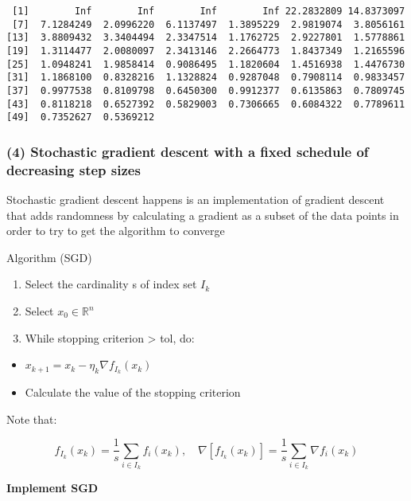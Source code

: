 \documentclass[
  letterpaper,
  DIV=11,
  numbers=noendperiod]{scrartcl}
\providecommand{\tightlist}{%
  \setlength{\itemsep}{0pt}\setlength{\parskip}{0pt}}\usepackage{longtable,booktabs,array}
\begin{document}
\begin{verbatim}
 [1]        Inf        Inf        Inf        Inf 22.2832809 14.8373097
 [7]  7.1284249  2.0996220  6.1137497  1.3895229  2.9819074  3.8056161
[13]  3.8809432  3.3404494  2.3347514  1.1762725  2.9227801  1.5778861
[19]  1.3114477  2.0080097  2.3413146  2.2664773  1.8437349  1.2165596
[25]  1.0948241  1.9858414  0.9086495  1.1820604  1.4516938  1.4476730
[31]  1.1868100  0.8328216  1.1328824  0.9287048  0.7908114  0.9833457
[37]  0.9977538  0.8109798  0.6450300  0.9912377  0.6135863  0.7809745
[43]  0.8118218  0.6527392  0.5829003  0.7306665  0.6084322  0.7789611
[49]  0.7352627  0.5369212
\end{verbatim}

\subsubsection{(4) Stochastic gradient descent with a fixed schedule of
decreasing step
sizes}\label{stochastic-gradient-descent-with-a-fixed-schedule-of-decreasing-step-sizes}

Stochastic gradient descent happens is an implementation of gradient
descent that adds randomness by calculating a gradient as a subset of
the data points in order to try to get the algorithm to converge

Algorithm (SGD)

\begin{enumerate}
\def\labelenumi{\arabic{enumi}.}
\tightlist
\item
  Select the cardinality s of index set \(I_k\)
\item
  Select \(x_0∈\mathbb{R}^n\)
\item
  While stopping criterion \textgreater{} tol, do:
\end{enumerate}

\begin{itemize}
\tightlist
\item
  \(x_{k+1} = x_k - \eta_{k}\nabla f_{I_k}(x_k)\)
\item
  Calculate the value of the stopping criterion
\end{itemize}

Note that:

\[
f_{I_k}(x_k) = \frac{1}{s} \sum_{i∈I_k} f_i(x_k), \quad \nabla{[f_{I_k}(x_k)]} = \frac{1}{s} \sum_{i∈I_k} \nabla f_i(x_k)
\]

\textbf{Implement SGD}
\end{document}
